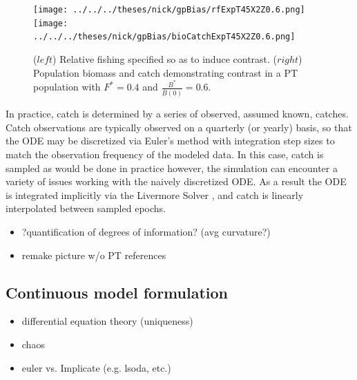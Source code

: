 \documentclass[12pt]{article}
\begin{document}
%
\begin{figure}[h!]
\texttt{[image: ../../../theses/nick/gpBias/rfExpT45X2Z0.6.png]}
\texttt{[image: ../../../theses/nick/gpBias/bioCatchExpT45X2Z0.6.png]}
\caption{ \label{catchT45}
($left$) Relative fishing specified so as to induce contrast.
($right$) Population biomass and catch demonstrating contrast in a {\color{red}PT population} with $F^*=0.4$ and $\frac{B^*}{\bar B(0)}=0.6$.
}
\end{figure}

%
\clearpage
%
In practice, catch is determined by a series of observed, assumed known, catches. 
Catch observations are typically observed on a quarterly (or yearly) basis, so 
that the ODE may be discretized via Euler’s method with integration step sizes 
to match the observation frequency of the modeled data. In this case, catch is sampled 
as would be done in practice however, the simulation can encounter a variety of issues 
working with the naively discretized ODE. As a result the ODE is integrated implicitly 
via the Livermore Solver , and catch 
is linearly interpolated between sampled epochs. 


\begin{itemize}
	\item ?quantification of degrees of information? (avg curvature?)
	\item remake picture w/o PT references
\end{itemize}


%
\subsection{Continuous model formulation}
	\begin{itemize}
		\item differential equation theory (uniqueness)
		\item chaos
		\item euler vs. Implicate (e.g. lsoda, etc.)		
	\end{itemize}
\end{document}
